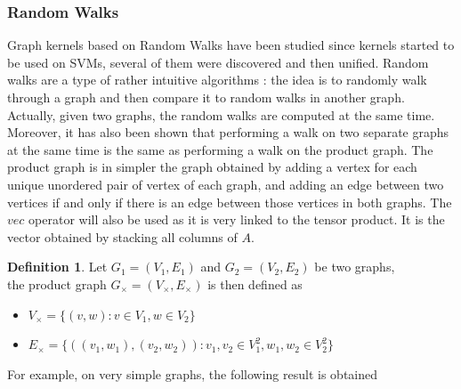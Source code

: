 \documentclass{article}
\theoremstyle{definition}
\newtheorem{definition}{Definition}
\begin{document}
\subsubsection{Random Walks}
Graph kernels based on Random Walks have been studied since kernels started to be used on SVMs\cite{kashima_graphkers_2003}, several of them were discovered and then unified\cite{vishwanathan_graph_2010}. Random walks are a type of rather intuitive algorithms : the idea is to randomly walk through a graph and then compare it to random walks in another graph. Actually, given two graphs, the random walks are computed at the same time.\\
Moreover, it has also been shown\cite{imrich2000product} that performing a walk on two separate graphs at the same time is the same as performing a walk on the product graph. The product graph is in simpler the graph obtained by adding a vertex for each unique unordered pair of vertex of each graph, and adding an edge between two vertices if and only if there is an edge between those vertices in both graphs. The $vec$ operator will also be used as it is very linked to the tensor product. It is the vector obtained by stacking all columns of $A$. \\
\begin{definition}
	Let $G_1=(V_{1},E_{1})$ and $G_2=(V_{2},E_{2})$ be two graphs,\\the product graph
	$G_\times = (V_{\times},E_{\times})$ is then defined as
	\begin{itemize}
		\item $V_{\times} = \{(v,w) : v \in V_{1}, w \in V_{2} \}$
		\item $E_{\times} = \{((v_1,w_1),(v_2,w_2)) : v_1,v_2 \in V_{1}^2, w_1,w_2 \in V_{2}^2 \}$
	\end{itemize}
\end{definition}
For example, on very simple graphs, the following result is obtained
\end{document}
